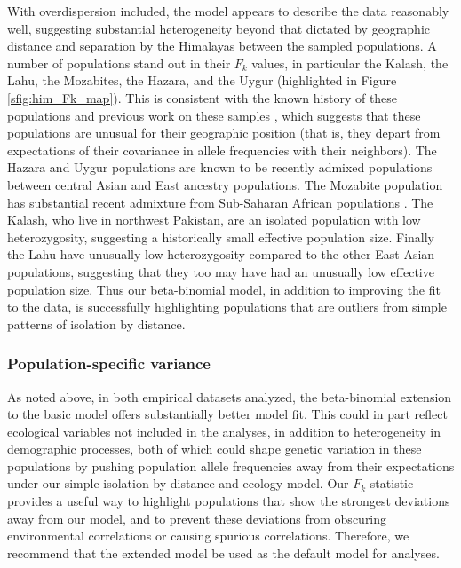  With overdispersion included, the model appears to describe the data reasonably well, suggesting substantial heterogeneity beyond that dictated by geographic distance and separation by the Himalayas between the sampled populations.  A number of populations stand out in their $F_{k}$ values, in particular the Kalash, the Lahu, the Mozabites, the Hazara, and the Uygur (highlighted in Figure \ref{sfig:him_Fk_map}). This is consistent with the known history of these populations and previous work on these samples \citep{Rosenberg2002}, which suggests that these populations are unusual for their geographic position (that is, they depart from expectations of their covariance in allele frequencies with their neighbors). The Hazara and Uygur populations are known to be recently admixed populations between central Asian and East ancestry populations.  The Mozabite population has substantial recent admixture from Sub-Saharan African populations \citep{Rosenberg2002,Rosenberg2011}.  The Kalash, who live in northwest Pakistan, are an isolated population with low heterozygosity, suggesting a historically small effective population size.  Finally the Lahu have unusually low heterozygosity compared to the other East Asian populations, suggesting that they too may have had an unusually low effective population size.  Thus our beta-binomial model, in addition to improving the fit to the data, is successfully highlighting populations that are outliers from simple patterns of isolation by distance.


\subsubsection*{Population-specific variance}
As noted above, in both empirical datasets analyzed, the beta-binomial extension to the basic model offers substantially better model fit. This could in part reflect ecological variables not included in the analyses, in addition to heterogeneity in demographic processes, both of which could shape genetic variation in these populations by pushing population allele frequencies away from their expectations under our simple isolation by distance and ecology model.  Our $F_{k}$ statistic provides a useful way to highlight populations that show the strongest deviations away from our model, and to prevent these deviations from obscuring environmental correlations or causing spurious correlations.  Therefore, we recommend that the extended model be used as the default model for analyses. 

